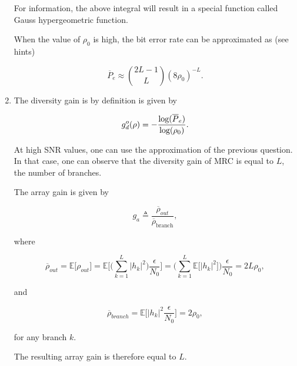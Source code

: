 \documentclass [a4paper, 11pt] {article}
\begin{document}
\begin{solution}
\begin{enumerate}
    For information, the above integral will result in a special function called Gauss hypergeometric function.

    When the value of $\rho_0$ is high, the bit error rate can be approximated as (see hints)

    \begin{equation}
    \overline{P}_e \approx \binom{2L-1}{L} (8\rho_0)^{-L}.
    \end{equation}

    \item The diversity gain is by definition is given by

    \begin{equation}
        g_d^o(\rho) = -\frac{\text{\normalfont log}(\overline{P}_e)}{\text{\normalfont log}(\rho_0)}.
    \end{equation}

    At high SNR values, one can use the approximation of the previous question. In that case, one can observe that the diversity gain of MRC is equal to $L$, the number of branches.

    The array gain is given by

    \begin{equation}
    g_a \triangleq \frac{\overline{\rho}_{out}}{\overline{\rho}_{\text{branch}}},
    \end{equation}

    where

    \begin{equation}\overline{\rho}_{out} = \mathbb{E}\big[ \rho_{out} \big] =  \mathbb{E}\Bigg[ \bigg( \sum_{k=1}^{L} |h_k|^2 \bigg) \dfrac{\epsilon}{N_0} \Bigg] =  \bigg( \sum_{k=1}^{L} \mathbb{E}\big[ |h_k|^2 \big] \bigg) \dfrac{\epsilon}{N_0} = 2L \rho_0,
    \end{equation}

    and

    \begin{equation}\overline{\rho}_{branch} = \mathbb{E}\bigg[|h_k|^2 \dfrac{\epsilon}{N_0} \bigg] = 2 \rho_0,
    \end{equation}

    for any branch $k$.

    The resulting array gain is therefore equal to $L$.

\end{enumerate}


    \end{solution}
\end{document}
